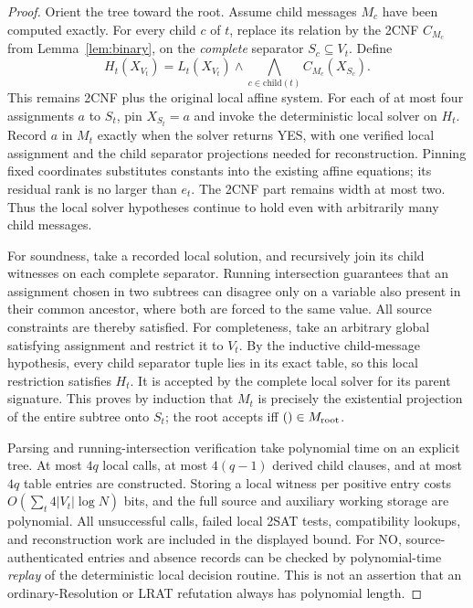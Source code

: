 \documentclass[11pt]{article}
\begin{document}
\begin{proof}
Orient the tree toward the root. Assume child messages $M_c$ have been
computed exactly. For every child $c$ of $t$, replace its relation by the
2CNF $C_{M_c}$ from Lemma~\ref{lem:binary}, on the \emph{complete} separator
$S_c\subseteq V_t$. Define
\[
 H_t(X_{V_t})=L_t(X_{V_t})\wedge
              \bigwedge_{c\in\mathrm{child}(t)}C_{M_c}(X_{S_c}).
\]
This remains 2CNF plus the original local affine system. For each of at most
four assignments $a$ to $S_t$, pin $X_{S_t}=a$ and invoke the deterministic
local solver on $H_t$. Record $a$ in $M_t$ exactly when the solver returns YES,
with one verified local assignment and the child separator projections needed
for reconstruction. Pinning fixed coordinates substitutes constants into the
existing affine equations; its residual rank is no larger than $e_t$.
The 2CNF part remains width at most two. Thus the local solver hypotheses
continue to hold even with arbitrarily many child messages.

For soundness, take a recorded local solution, and recursively join its child
witnesses on each complete separator. Running intersection guarantees that
an assignment chosen in two subtrees can disagree only on a variable also
present in their common ancestor, where both are forced to the same value.
All source constraints are thereby satisfied. For completeness, take an
arbitrary global satisfying assignment and restrict it to $V_t$. By the
inductive child-message hypothesis, every child separator tuple lies in its
exact table, so this local restriction satisfies $H_t$. It is accepted by the
complete local solver for its parent signature. This proves by induction that
$M_t$ is precisely the existential projection of the entire subtree onto
$S_t$; the root accepts iff $()\in M_{\rm root}$.

Parsing and running-intersection verification take polynomial time on an
explicit tree. At most $4q$ local calls, at most $4(q-1)$ derived child
clauses, and at most $4q$ table entries are constructed. Storing a local
witness per positive entry costs $O(\sum_t4|V_t|\log N)$ bits, and the full
source and auxiliary working storage are polynomial. All unsuccessful
calls, failed local 2SAT tests, compatibility lookups, and reconstruction
work are included in the displayed bound. For NO, source-authenticated
entries and absence records can be checked by polynomial-time \emph{replay}
of the deterministic local decision routine. This is not an assertion that
an ordinary-Resolution or LRAT refutation always has polynomial length.
\end{proof}
\end{document}
